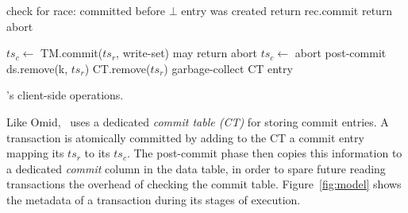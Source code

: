 \begin{algorithm}[t]
\begin{algorithmic}
{ 				   
 				 	\State \Comment check for race: committed before $\bot$ entry was created
 				 	  return rec.commit \EndIf
 				 	\State return abort 				
				\EndIf
%
	   	\EndProcedure
}


      	\State $ts_c \leftarrow$ TM.commit($ts_r$, write-set) \Comment may return abort
   		 	\State $ts_c \leftarrow$ abort  %
   		 \EndIf
	\EndIf
	\State \Comment post-commit
			 ds.remove(k, $ts_r$)  	
			\EndIf
	\EndFor
	\State CT.remove($ts_r$) \Comment garbage-collect CT entry
\EndProcedure
      
  \end{algorithmic}
  \caption{\sysll's client-side operations.} 
  \label{fig:get-pseudocode}
\end{algorithm} 

Like Omid, \sysll\ uses a dedicated \emph{commit table (CT)} for storing commit entries.
A transaction is atomically committed by adding to the CT a commit entry mapping its $ts_r$ to its $ts_c$.
The post-commit phase then copies this information to 
a dedicated \emph{commit} column in the data table, in order to spare future reading transactions
 the overhead of checking the commit table. 
 Figure~\ref{fig:model} shows the metadata of a transaction during its stages of execution. 

